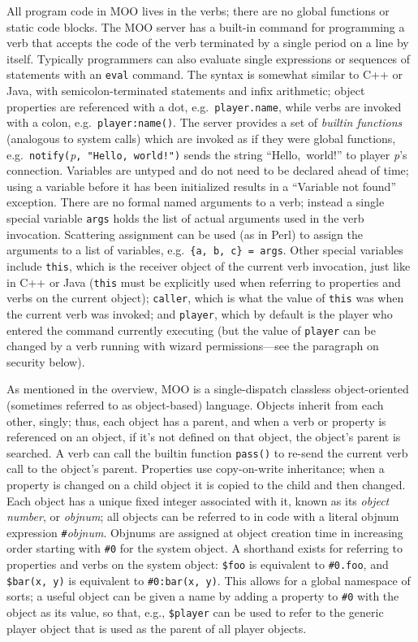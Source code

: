 \documentclass{article}
\begin{document}
All program code in MOO lives in the verbs; there are no global
functions or static code blocks.  The MOO server has a built-in
command for programming a verb that accepts the code of the verb
terminated by a single period on a line by itself.  Typically
programmers can also evaluate single expressions or sequences of
statements with an \texttt{eval} command.  The syntax is somewhat
similar to C++ or Java, with semicolon-terminated statements and infix
arithmetic; object properties are referenced with a dot,
e.g.~\texttt{player.name}, while verbs are invoked with a colon,
e.g.~\texttt{player:name()}.  The server provides a set of
\emph{builtin functions} (analogous to system calls) which are
invoked as if they were global functions,
e.g.~\texttt{notify(}\textit{p}\texttt{,~"Hello,~world!")} sends the
string ``Hello,~world!'' to player \textit{p}'s connection.  Variables
are untyped and do not need to be declared ahead of time; using a
variable before it has been initialized results in a ``Variable not
found'' exception.  There are no formal named arguments to a verb;
instead a single special variable \texttt{args} holds the list of
actual arguments used in the verb invocation.  Scattering assignment
can be used (as in Perl) to assign the arguments to a list of
variables, e.g.~\texttt{\{a,~b,~c\}~=~args}.  Other special variables
include \texttt{this}, which is the receiver object of the
current verb invocation, just like in C++ or Java 
(\texttt{this} must be explicitly used when referring to properties
and verbs on the current object);
\texttt{caller}, which is what the value of \texttt{this} was when the
current verb was invoked; and \texttt{player}, which by default is the
player who entered the command currently executing (but the value of
\texttt{player} can be changed by a verb running with wizard
permissions---see the paragraph on security below).

As mentioned in the overview, MOO is a single-dispatch classless
object-oriented (sometimes referred to as object-based) language.
Objects inherit from each other, singly; thus, each object has a
parent, and when a verb or property is referenced on an object, if
it's not defined on that object, the object's parent is searched.  A
verb can call the builtin function \texttt{pass()} to re-send the
current verb call to the object's parent.  Properties use
copy-on-write inheritance; when a property is changed on a child
object it is copied to the child and then changed.  Each object has a
unique fixed integer associated with it, known as its \emph{object
number}, or \emph{objnum}; all objects can be referred to in code with
a literal objnum expression \texttt{\#}\textit{objnum}.  Objnums are
assigned at object creation time in increasing order starting with
\texttt{\#0} for the system object.  A shorthand exists for referring
to properties and verbs on the system object: \texttt{\$foo} is
equivalent to \texttt{\#0.foo}, and \texttt{\$bar(x,~y)} is equivalent
to \texttt{\#0:bar(x,~y)}.  This allows for a global namespace of
sorts; a useful object can be given a name by adding a property to
\texttt{\#0} with the object as its value, so that, e.g.,
\texttt{\$player} can be used to refer to the generic player object
that is used as the parent of all player objects.
\end{document}
